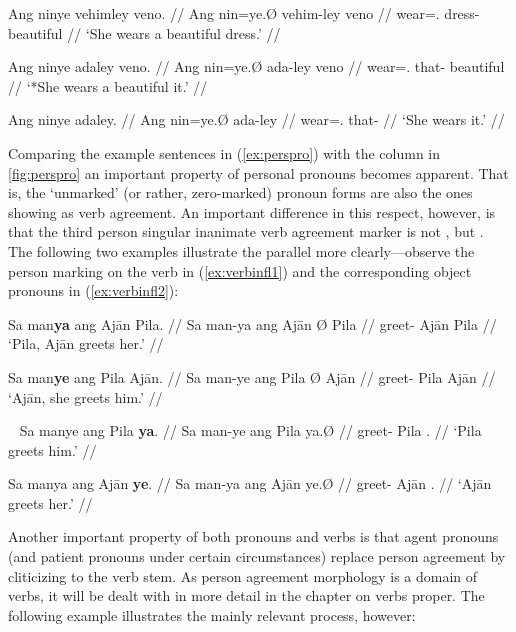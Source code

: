 \pex\label{ex:procompldist}
\a\begingl
	\gla Ang ninye vehimley veno. //
	\glb Ang nin=ye.Ø vehim-ley veno //
	\glc \Aarg{} wear=\TsgF{}.\Top{} dress-\PargI{} beautiful //
	\glft `She wears a beautiful dress.' //
\endgl

\a\ljudge* \begingl
	\gla Ang ninye adaley veno. //
	\glb Ang nin=ye.Ø ada-ley veno //
	\glc \Aarg{} wear=\TsgF{}.\Top{} that-\PargI{} beautiful //
	\glft `*She wears a beautiful it.' //
\endgl

\a\begingl
	\gla Ang ninye adaley. //
	\glb Ang nin=ye.Ø ada-ley //
	\glc \Aarg{} wear=\TsgF{}.\Top{} that-\PargI{} //
	\glft `She wears it.' //
\endgl

\xe

Comparing the example sentences in (\ref{ex:perspro}) with the \Top{} column in
\autoref{fig:perspro} an important property of personal pronouns becomes 
apparent. That is, the `unmarked' (or rather, zero-marked) pronoun forms are 
also the ones showing as verb agreement. An important difference in this 
respect, however, is that the third person singular inanimate verb agreement 
marker is not , but . The following two examples 
illustrate the parallel more clearly---observe the person marking on the verb 
in (\ref{ex:verbinfl1}) and the corresponding object pronouns in 
(\ref{ex:verbinfl2}):

\pex\label{ex:verbinfl1}
\a\begingl
	\gla Sa man\textbf{ya} ang Ajān {} Pila. //
	\glb Sa man-ya ang ​Ajān Ø ​Pila //
	\glc \PatT{} greet-\TsgM{} \Aarg{} ​Ajān \Top{} ​Pila //
	\glft `Pila, Ajān greets her.' //
\endgl

\a\begingl
	\gla Sa man\textbf{ye} ang Pila {} Ajān. //
	\glb Sa man-ye ang Pila Ø ​Ajān //
	\glc \PatT{} greet-\TsgF{} \Aarg{} Pila \Top{} ​Ajān //
	\glft `Ajān, she greets him.' //
\endgl

\xe

\pex~\label{ex:verbinfl2}
\a\begingl
	\gla Sa manye ang Pila \textbf{ya}. //
	\glb Sa man-ye ang Pila ya.Ø //
	\glc \PatT{} greet-\TsgF{} \Aarg{} Pila \TsgM{}.\Top{} //
	\glft `Pila greets him.' //
\endgl

\a\begingl
	\gla Sa manya ang Ajān \textbf{ye}. //
	\glb Sa man-ya ang ​Ajān ye.Ø //
	\glc \PatT{} greet-\TsgM{} \Aarg{} ​Ajān \TsgF{}.\Top{} //
	\glft `Ajān greets her.' //
\endgl

\xe

Another important property of both pronouns and verbs is that agent pronouns
(and patient pronouns under certain circumstances) replace person agreement by
cliticizing to the verb stem. As person agreement morphology is a domain of
verbs, it will be dealt with in more detail in the chapter on verbs proper. The
following example illustrates the mainly relevant process, however:


